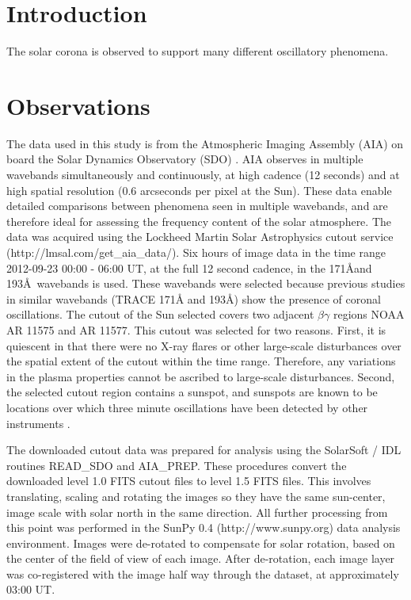 \documentclass{aastex}
\begin{document}
{\section{Introduction}

The solar corona is observed to support many different oscillatory
phenomena.



\section{Observations}\label{sec:obs}

The data used in this study is from the Atmospheric Imaging Assembly
(AIA) \cite{2012SoPh..275...17L} on board the Solar Dynamics
Observatory (SDO) \cite{2012SoPh..275....3P}.  AIA observes in
multiple wavebands simultaneously and continuously, at high cadence
(12 seconds) and at high spatial resolution (0.6 arcseconds per pixel
at the Sun).  These data enable detailed comparisons between phenomena
seen in multiple wavebands, and are therefore ideal for assessing the
frequency content of the solar atmosphere.  The data was acquired
using the Lockheed Martin Solar Astrophysics cutout service
(http://lmsal.com/get\_aia\_data/).  Six hours of image data in the
time range 2012-09-23 00:00 - 06:00 UT, at the full 12 second cadence,
in the 171\AA and 193\AA\ wavebands is used.  These wavebands were
selected because previous studies in similar wavebands (TRACE 171\AA
and 193\AA) show the presence of coronal oscillations.  The cutout of
the Sun selected covers two adjacent $\beta\gamma$ regions NOAA AR
11575 and AR 11577.  This cutout was selected for two reasons.  First,
it is quiescent in that there were no X-ray flares or other
large-scale disturbances over the spatial extent of the cutout within
the time range.  Therefore, any variations in the plasma properties
cannot be ascribed to large-scale disturbances.  Second, the selected
cutout region contains a sunspot, and sunspots are known to be
locations over which three minute oscillations have been detected by
other instruments \citep{2002A&A...387L..13D}.

The downloaded cutout data was prepared for analysis using the
SolarSoft / IDL routines READ\_SDO and AIA\_PREP.  These procedures
convert the downloaded level 1.0 FITS cutout files to level 1.5 FITS
files.  This involves translating, scaling and rotating the images so
they have the same sun-center, image scale with solar north in the
same direction.  All further processing from this point was performed
in the SunPy 0.4 (http://www.sunpy.org) data analysis environment.
Images were de-rotated to compensate for solar rotation, based on the
center of the field of view of each image.  After de-rotation, each
image layer was co-registered with the image half way through the
dataset, at approximately 03:00 UT.

}
\end{document}
